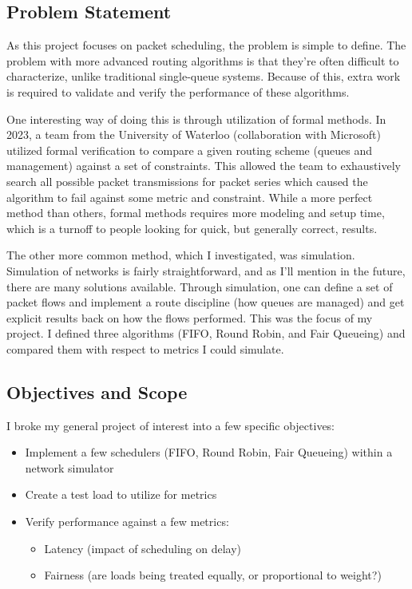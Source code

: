 \documentclass[conference]{IEEEtran}
\begin{document}
    \subsection{Problem Statement}
    As this project focuses on packet scheduling, the problem is simple to define.
    The problem with more advanced routing algorithms is that they're often difficult to characterize, unlike traditional
    single-queue systems.
    Because of this, extra work is required to validate and verify the performance of these algorithms.

    One interesting way of doing this is through utilization of formal methods.
    In 2023, a team from the University of Waterloo (collaboration with Microsoft)~\cite{arashloo_formal_2023} utilized formal verification to compare
    a given routing scheme (queues and management) against a set of constraints.
    This allowed the team to exhaustively search all possible packet transmissions for packet series which caused the algorithm
    to fail against some metric and constraint.
    While a more perfect method than others, formal methods requires more modeling and setup time, which is a turnoff to people
    looking for quick, but generally correct, results.

    The other more common method, which I investigated, was simulation.
    Simulation of networks is fairly straightforward,
    and as I'll mention in the future, there are many solutions available.
    Through simulation, one can define a set of packet flows and implement a route discipline (how queues are managed) and
    get explicit results back on how the flows performed.
    This was the focus of my project.
    I defined three algorithms (FIFO, Round Robin, and Fair Queueing) and compared them with respect to metrics I could simulate.

    \subsection{Objectives and Scope} \label{subsec:obj_scope}
    I broke my general project of interest into a few specific objectives:

    \begin{itemize}
        \item Implement a few schedulers (FIFO, Round Robin, Fair Queueing) within a network simulator
        \item Create a test load to utilize for metrics
        \item Verify performance against a few metrics:
        \begin{itemize}
            \item Latency (impact of scheduling on delay)
            \item Fairness (are loads being treated equally, or proportional to weight?)
        \end{itemize}
    \end{itemize}
\end{document}
